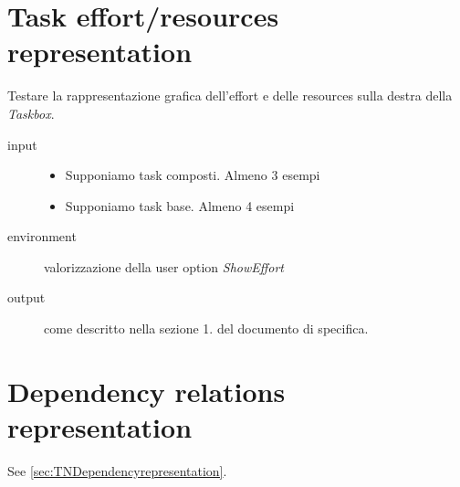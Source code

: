 \section{Task effort/resources representation}
\label{sec:ganttResourcesTaskRepresentation}
Testare la rappresentazione grafica dell'effort e delle resources sulla destra
della \emph{Taskbox}.
\begin{description}
\item[input]  \quad
\begin{itemize}
  \item Supponiamo task composti. Almeno 3 esempi
  \item Supponiamo task base. Almeno 4 esempi
\end{itemize}
\item[environment] valorizzazione della user option \emph{ShowEffort}
\item[output] come descritto nella sezione 1. del
documento di specifica.
\end{description}

\section{Dependency relations representation}
See \ref{sec:TNDependencyrepresentation}.


